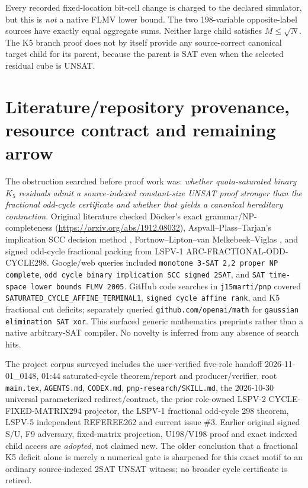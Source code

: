 \documentclass[11pt]{article}
\begin{document}
Every recorded fixed-location bit-cell change is charged to the declared simulator, but this is \emph{not} a native FLMV lower bound. The two 198-variable opposite-label sources have exactly equal aggregate sums. Neither large child satisfies $M\le\sqrt N$. The K5 branch proof does not by itself provide any source-correct canonical target child for its parent, because the parent is SAT even when the selected residual cube is UNSAT.

\section{Literature/repository provenance, resource contract and remaining arrow}
The obstruction searched before proof work was: \emph{whether quota-saturated binary $K_5$ residuals admit a source-indexed constant-size UNSAT proof stronger than the fractional odd-cycle certificate and whether that yields a canonical hereditary contraction}. Original literature checked D\"ocker's exact grammar/NP-completeness (\url{https://arxiv.org/abs/1912.08032}), Aspvall--Plass--Tarjan's implication SCC decision method \cite{aspvall1979}, Fortnow--Lipton--van Melkebeek--Viglas \cite{flmv2005}, and signed odd-cycle fractional packing from LSPV-1 ARC-FRACTIONAL-ODD-CYCLE298. Google/web queries included \texttt{monotone 3-SAT 2,2 proper NP complete}, \texttt{odd cycle binary implication SCC signed 2SAT}, and \texttt{SAT time-space lower bounds FLMV 2005}. GitHub code searches in \texttt{j15marti/pnp} covered \texttt{SATURATED\_CYCLE\_AFFINE\_TERMINAL1}, \texttt{signed cycle affine rank}, and K5 fractional cut deficits; separately queried \texttt{github.com/openai/math} for \texttt{gaussian elimination SAT xor}. This surfaced generic mathematics preprints rather than a native arbitrary-SAT compiler. No novelty is inferred from any absence of search hits.

The project corpus surveyed includes the user-verified five-role handoff 2026-11-01\_0148, 01:44 saturated-cycle theorem/report and producer/verifier, root \texttt{main.tex}, \texttt{AGENTS.md}, \texttt{CODEX.md}, \texttt{pnp-research/SKILL.md}, the 2026-10-30 universal parameterized redirect/contract, the prior role-owned LSPV-2 CYCLE-FIXED-MATRIX294 projector, the LSPV-1 fractional odd-cycle 298 theorem, LSPV-5 independent REFEREE262 and current issue \#3. Earlier original signed S/U, F9 adversary, fixed-matrix projection, U198/V198 proof and exact indexed child access are \emph{adopted}, not claimed new. The older conclusion that a fractional K5 deficit alone is merely a numerical gate is sharpened for this exact motif to an ordinary source-indexed 2SAT UNSAT witness; no broader cycle certificate is retired.
\end{document}
